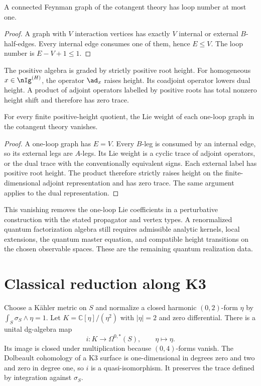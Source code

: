 \begin{lemma}
A connected Feynman graph of the cotangent theory has loop number at most one.
\end{lemma}
\begin{proof}
A graph with $V$ interaction vertices has exactly $V$ internal or external $B$-half-edges.  Every internal edge consumes one of them, hence $E\le V$.  The loop number is $E-V+1\le1$.
\end{proof}

The positive algebra is graded by strictly positive root height.  For homogeneous $x\in\nIg^{(H)}$, the operator $\ad_x$ raises height.  Its coadjoint operator lowers dual height.  A product of adjoint operators labelled by positive roots has total nonzero height shift and therefore has zero trace.

\begin{proposition}\label{cyiv:loop-weights}
For every finite positive-height quotient, the Lie weight of each
one-loop graph in the cotangent theory vanishes.
\end{proposition}
\begin{proof}
A one-loop graph has $E=V$.
Every $B$-leg is consumed by an internal edge, so its external legs are
$A$-legs.
Its Lie weight is a cyclic trace of adjoint operators, or the dual
trace with the conventionally equivalent signs.
Each external label has positive root height.
The product therefore strictly raises height on the finite-dimensional
adjoint representation and has zero trace.
The same argument applies to the dual representation.
\end{proof}

This vanishing removes the one-loop Lie coefficients in a perturbative
construction with the stated propagator and vertex types.
A renormalized quantum factorization algebra still requires admissible
analytic kernels, local extensions, the quantum master equation, and
compatible height transitions on the chosen observable spaces.
These are the remaining quantum realization data.

\chapter{Classical reduction along K3}
Choose a K\"ahler metric on $S$ and normalize a closed harmonic
$(0,2)$-form $\eta$ by $\int_S\sigma_S\wedge\eta=1$.
Let $K=\mathbb C[\eta]/(\eta^2)$ with $|\eta|=2$ and zero differential.
There is a unital dg-algebra map
\[
 i:K\longrightarrow\Omega^{0,*}(S),\qquad \eta\longmapsto\eta.
\]
Its image is closed under multiplication because $(0,4)$-forms vanish.
The Dolbeault cohomology of a K3 surface is one-dimensional in degrees
zero and two and zero in degree one, so $i$ is a quasi-isomorphism.
It preserves the trace defined by integration against $\sigma_S$.

